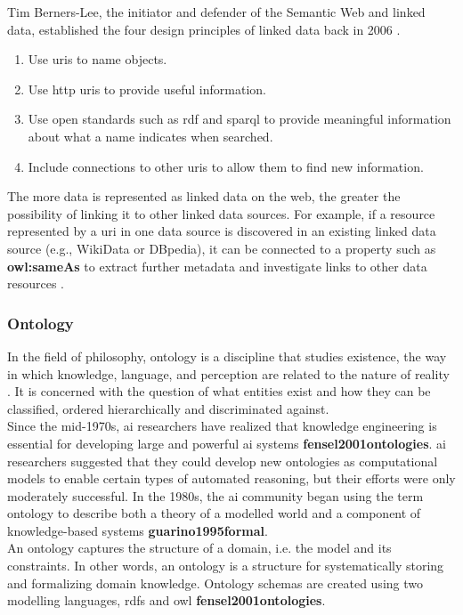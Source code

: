     Tim Berners-Lee, the initiator and defender of the Semantic Web and linked data, established the four design principles of linked data back in 2006 \cite{bizer2008linked, bizer2011linked}.
    \begin{enumerate}
        \item Use \acrshort{uri}s to name objects.
        \item Use \acrshort{http} \acrshort{uri}s to provide useful information. 
        \item Use open standards such as \acrshort{rdf} and \acrshort{sparql} to provide meaningful information about what a name indicates when searched. 
        \item Include connections to other \acrshort{uri}s to allow them to find new information. 
    \end{enumerate}

    The more data is represented as linked data on the web, the greater the possibility of linking it to other linked data sources. For example, if a resource represented by a \acrshort{uri} in one data source is discovered in an existing linked data source (e.g., WikiData or DBpedia), it can be connected to a property such as \textbf{owl:sameAs} to extract further metadata and investigate links to other data resources \cite{bizer2008linked}.\\

    \subsubsection{Ontology \label{subsubsec:ontology}}
    In the field of philosophy, ontology is a discipline that studies existence, the way in which knowledge, language, and perception are related to the nature of reality \cite{smith2012ontology}. It is concerned with the question of what entities exist and how they can be classified, ordered hierarchically and discriminated against. \\
    Since the mid-1970s, \acrshort{ai} researchers have realized that knowledge engineering is essential for developing large and powerful \acrshort{ai} systems \textbf{fensel2001ontologies}. \acrshort{ai} researchers suggested that they could develop new ontologies as computational models to enable certain types of automated reasoning, but their efforts were only moderately successful. In the 1980s, the \acrshort{ai} community began using the term ontology to describe both a theory of a modelled world and a component of knowledge-based systems \textbf{guarino1995formal}.\\
    An ontology captures the structure of a domain, i.e. the model and its constraints. In other words, an ontology is a structure for systematically storing and formalizing domain knowledge. Ontology schemas are created using two modelling languages, \acrfull{rdfs} and \acrfull{owl} \textbf{fensel2001ontologies}.\\

